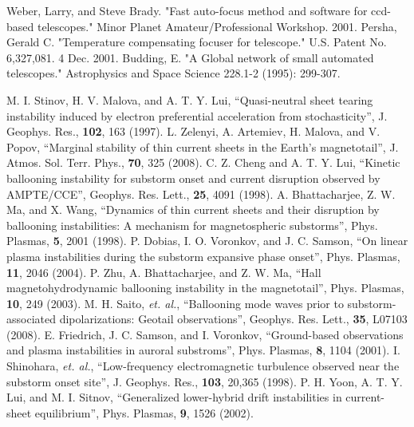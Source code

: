 \documentclass[twoside,11pt]{gshs_thesis}
\begin{document}
\clearpage
\begin{thebibliography}{99}\begin{onehalfspace}

Weber, Larry, and Steve Brady. "Fast auto-focus method and software for ccd-based telescopes." Minor Planet Amateur/Professional Workshop. 2001.
 Persha, Gerald C. "Temperature compensating focuser for telescope." U.S. Patent No. 6,327,081. 4 Dec. 2001.
Budding, E. "A Global network of small automated telescopes." Astrophysics and Space Science 228.1-2 (1995): 299-307.

 M. I. Stinov, H. V. Malova, and A. T. Y. Lui, ``Quasi-neutral sheet tearing instability induced by electron preferential acceleration from stochasticity'', J. Geophys. Res., {\bf 102}, 163 (1997).
 L. Zelenyi, A. Artemiev, H. Malova, and V. Popov, ``Marginal stability of thin current sheets in the Earth's magnetotail'', J. Atmos. Sol. Terr. Phys., {\bf 70}, 325 (2008).
 C. Z. Cheng and A. T. Y. Lui, ``Kinetic ballooning instability for substorm onset and current disruption observed by AMPTE/CCE'', Geophys. Res. Lett., {\bf 25}, 4091 (1998).
 A. Bhattacharjee, Z. W. Ma, and X. Wang, ``Dynamics of thin current sheets and their disruption by ballooning instabilities: A mechanism for magnetospheric substorms'', Phys. Plasmas, {\bf 5}, 2001 (1998).
 P. Dobias, I. O. Voronkov, and J. C. Samson, ``On linear plasma instabilities during the substorm expansive phase onset'', Phys. Plasmas, {\bf 11}, 2046 (2004).
 P. Zhu, A. Bhattacharjee, and Z. W. Ma, ``Hall magnetohydrodynamic ballooning instability in the magnetotail'', Phys. Plasmas, {\bf 10}, 249 (2003).
 M. H. Saito, {\it et. al.}, ``Ballooning mode waves prior to substorm-associated dipolarizations: Geotail observations'', Geophys. Res. Lett., {\bf 35}, L07103 (2008).
 E. Friedrich, J. C. Samson, and I. Voronkov, ``Ground-based observations and plasma instabilities in auroral substroms'', Phys. Plasmas, {\bf 8}, 1104 (2001).
 I. Shinohara, {\it et. al.}, ``Low-frequency electromagnetic turbulence observed near the substorm onset site'', J. Geophys. Res., {\bf 103}, 20,365 (1998).
 P. H. Yoon, A. T. Y. Lui, and M. I. Sitnov, ``Generalized lower-hybrid drift instabilities in current-sheet equilibrium'', Phys. Plasmas, {\bf 9}, 1526 (2002).

\end{onehalfspace}
\end{thebibliography}
\end{document}
